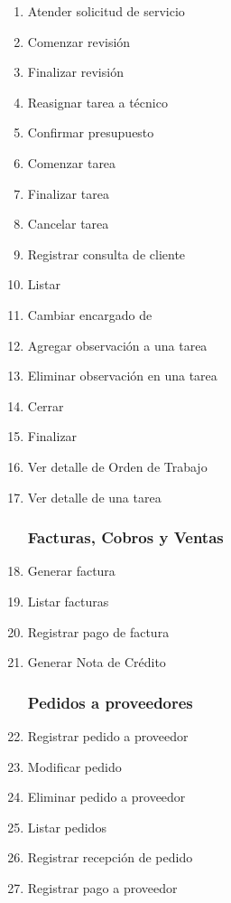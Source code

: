 \documentclass[12pt]{extarticle}
\begin{document}
\begin{spacing}{1.2}
\begin{multicols}{2}
\begin{enumerate}
			\item Atender solicitud de servicio            
            \item Comenzar revisión
            \item Finalizar revisión
            \item Reasignar tarea a técnico
            \item Confirmar presupuesto
            \item Comenzar tarea 
            \item Finalizar tarea
            \item Cancelar tarea
            \item Registrar consulta de cliente
            \item Listar \OTs{}
            \item Cambiar encargado de \OT{}
            \item Agregar observación a una tarea
            \item Eliminar observación en una tarea
            \item Cerrar \OT{}
            \item Finalizar \OT{}
            \item Ver detalle de Orden de Trabajo
            \item Ver detalle de una tarea
        \subsubsection*{Facturas, Cobros y Ventas}
            \item Generar factura 
            \item Listar facturas
            \item Registrar pago de factura
            \item Generar Nota de Crédito
        \subsubsection*{Pedidos a proveedores}
            \item Registrar pedido a proveedor
            \item Modificar pedido 
            \item Eliminar pedido a proveedor
            \item Listar pedidos
            \item Registrar recepción de pedido
            \item Registrar pago a proveedor
    \end{enumerate}
    \end{multicols}


\end{spacing}
\end{document}
